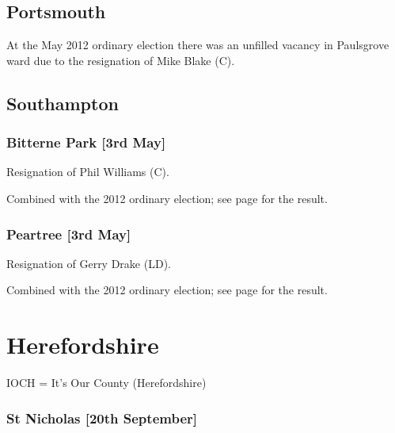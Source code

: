 \documentclass[a4paper,openany]{book}
\begin{document}
\begin{resultsiii}
\subsection*{Portsmouth}

At the May 2012 ordinary election there was an unfilled vacancy in Paulsgrove ward due to the resignation of Mike Blake (C).

\subsection*{Southampton}

\subsubsection*{Bitterne Park \hspace*{\fill}\nolinebreak[1]%
\enspace\hspace*{\fill}
[3rd May]}


Resignation of Phil Williams (C).

Combined with the 2012 ordinary election; see page \pageref{BitterneParkSouthampton} for the result.

\subsubsection*{Peartree \hspace*{\fill}\nolinebreak[1]%
\enspace\hspace*{\fill}
[3rd May]}


Resignation of Gerry Drake (LD).

Combined with the 2012 ordinary election; see page \pageref{PeartreeSouthampton} for the result.

\section{Herefordshire}

IOCH = It's Our County (Herefordshire)

\subsubsection*{St Nicholas \hspace*{\fill}\nolinebreak[1]%
\enspace\hspace*{\fill}
[20th September]}


\end{resultsiii}
\end{document}
